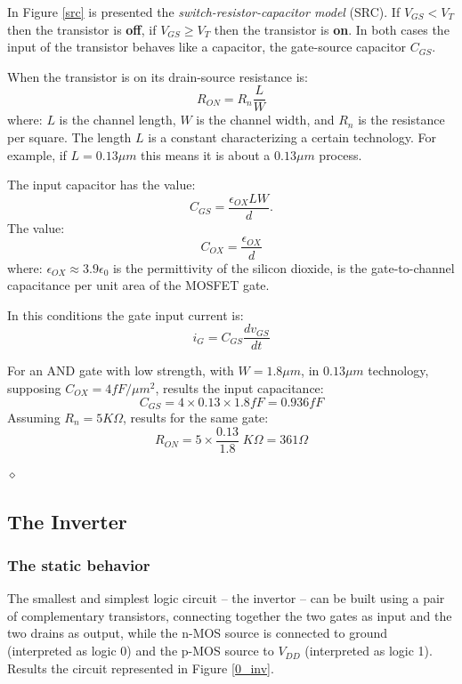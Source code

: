 In Figure \ref{src} is presented the {\em switch-resistor-capacitor
model} (SRC). If $V_{GS} < V_{T}$ then the transistor is {\bf off}, if
$V_{GS} \geq V_{T}$ then the transistor is {\bf on}. In both cases the
input of the transistor behaves like a capacitor, the gate-source
capacitor $C_{GS}$.

When the transistor is on its drain-source resistance is:
$$R_{ON} = R_{n}\frac{L}{W}$$
where: $L$ is the channel length, $W$ is the channel width, and $R_{n}$
is the resistance per square. The length $L$ is a constant
characterizing a certain technology. For example, if $L = 0.13\mu m$
this means it is about a $0.13\mu m$ process.

The input capacitor has the value:
$$C_{GS} = \frac{\epsilon_{OX} LW}{d}.$$
The value:
$$C_{OX} = \frac{\epsilon_{OX}}{d}$$
where: $\epsilon_{OX} \approx 3.9 \epsilon_{0}$ is the permittivity of
the silicon dioxide, is  the gate-to-channel capacitance per unit area
of the MOSFET gate.

In this conditions the gate input current is:
$$i_{G} = C_{GS} \frac{dv_{GS}}{dt}$$



\begin{exemplu}
For an AND gate with low strength, with $W = 1.8\mu m$, in $0.13
\mu m$ technology, supposing $C_{OX} = 4fF/\mu m^{2}$, results the
input capacitance: $$C_{GS} = 4 \times 0.13 \times 1.8 fF = 0.936
fF$$ Assuming $R_{n} = 5K\Omega$, results for the same gate:
$$R_{ON} = 5 \times \frac{0.13}{1.8} \; K\Omega = 361 \Omega$$

$\diamond$
\end{exemplu}

\subsection{The Inverter}


\subsubsection{The static behavior}

The smallest and simplest logic circuit -- the invertor -- can be built
using a pair of complementary transistors, connecting together the two
gates as input and the two drains as output, while the n-MOS source is
connected to ground (interpreted as logic 0) and the p-MOS source to
$V_{DD}$ (interpreted as logic 1). Results the circuit represented in
Figure \ref{0_inv}.

